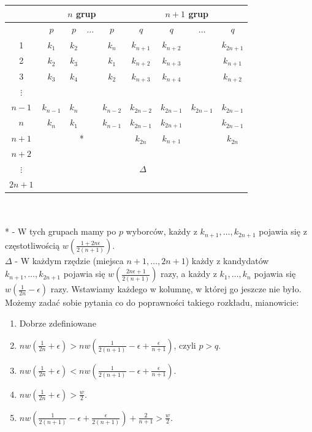 \documentclass[12pt,a4paper]{article}
\theoremstyle{break}
\begin{document}
	\begin{tabular}{|c|cccc|cccc|}\hline
		&\multicolumn{4}{c|}{$n$ grup}&\multicolumn{4}{c|}{$n+1$ grup}\\\hline
		&$p$&$p$&$\dots$&$p$&$q$&$q$&$\dots$&$q$\\\hline
		1&$k_1$&$k_2$&&$k_n$&$k_{n+1}$&$k_{n+2}$&&$k_{2n+1}$\\
		2&$k_2$&$k_3$&&$k_1$&$k_{n+2}$&$k_{n+3}$&&$k_{n+1}$\\
		3&$k_3$&$k_4$&&$k_2$&$k_{n+3}$&$k_{n+4}$&&$k_{n+2}$\\
		
		$\vdots$&&&&&&&&\\
		
		$n-1$&$k_{n-1}$&$k_n$&&$k_{n-2}$&$k_{2n-2}$&$k_{2n-1}$&$k_{2n-1}$&$k_{2n-1}$\\
		$n$&$k_n$&$k_1$&&$k_{n-1}$&$k_{2n-1}$&$k_{2n+1}$&&$k_{2n-1}$\\\hline
		$n+1$&\multicolumn{4}{c|}{*}&$k_{2n}$&$k_{n+1}$&&$k_{2n}$\\\hline
		$n+2$&\multicolumn{8}{|c|}{ }\\
		
		$\vdots$&\multicolumn{8}{|c|}{$\Delta$}\\
		
		$2n+1$&\multicolumn{8}{|c|}{ }\\\hline
	\end{tabular}\\\\
	
	 * - W tych grupach mamy po $p$ wyborców, każdy z $k_{n+1}, \dots, k_{2n+1}$ pojawia się z częstotliwością $w\left(\frac{1+2n\epsilon}{2(n+1)}\right)$.\\
	
	$\Delta$ - W każdym rzędzie (miejsca $n+1, \dots, 2n+1$) każdy z kandydatów $k_{n+1}, \dots, k_{2n+1}$ pojawia się $w\left(\frac{2n\epsilon+1}{2(n+1)}\right)$ razy, a każdy z $k_1, \dots, k_n$ pojawia się $w\left(\frac{1}{2n}-\epsilon\right)$ razy. Wstawiamy każdego w kolumnę, w której go jeszcze nie było. \\
	
	Możemy zadać sobie pytania co do poprawności takiego rozkładu, mianowicie:
	
	\begin{enumerate}[1)]
		\item Dobrze zdefiniowane \\
		\item  $nw\left(\frac{1}{2n}+\epsilon\right) > nw\left(\frac{1}{2(n+1)} - \epsilon + \frac{\epsilon}{n+1}\right)$, czyli $p > q$. \\
		\item  $nw\left(\frac{1}{2n}+\epsilon\right) < nw\left(\frac{1}{2(n+1)} - \epsilon + \frac{\epsilon}{n+1}\right)$. \\
		\item  $nw\left(\frac{1}{2n}+\epsilon\right) > \frac{w}{2}$. \\
		\item  $nw\left(\frac{1}{2(n+1)}-\epsilon + \frac{\epsilon}{2(n+1)}\right) + \frac{2}{n+1} > \frac{w}{2}$. \\
	\end{enumerate}
\end{document}
